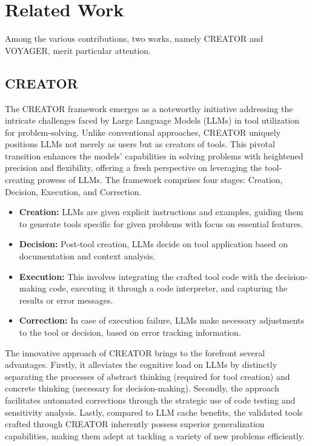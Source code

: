\section{Related Work}

Among the various contributions, two works, namely CREATOR and VOYAGER, merit particular attention.

\subsection{CREATOR}

The CREATOR framework emerges as a noteworthy initiative addressing the intricate challenges faced by Large Language Models (LLMs) in tool utilization for problem-solving. Unlike conventional approaches, CREATOR uniquely positions LLMs not merely as users but as creators of tools. This pivotal transition enhances the models’ capabilities in solving problems with heightened precision and flexibility, offering a fresh perspective on leveraging the tool-creating prowess of LLMs. The framework comprises four stages: Creation, Decision, Execution, and Correction.
\begin{itemize}
    \item \textbf{Creation:} LLMs are given explicit instructions and examples, guiding them to generate tools specific for given problems with focus on essential features.
    \item \textbf{Decision:} Post-tool creation, LLMs decide on tool application based on documentation and context analysis.
    \item \textbf{Execution:} This involves integrating the crafted tool code with the decision-making code, executing it through a code interpreter, and capturing the results or error messages.
    \item \textbf{Correction:} In case of execution failure, LLMs make necessary adjustments to the tool or decision, based on error tracking information.
\end{itemize}

The innovative approach of CREATOR brings to the forefront several advantages. Firstly, it alleviates the cognitive load on LLMs by distinctly separating the processes of abstract thinking (required for tool creation) and concrete thinking (necessary for decision-making). Secondly, the approach facilitates automated corrections through the strategic use of code testing and sensitivity analysis. Lastly, compared to LLM cache benefits, the validated tools crafted through CREATOR inherently possess superior generalization capabilities, making them adept at tackling a variety of new problems efficiently.

